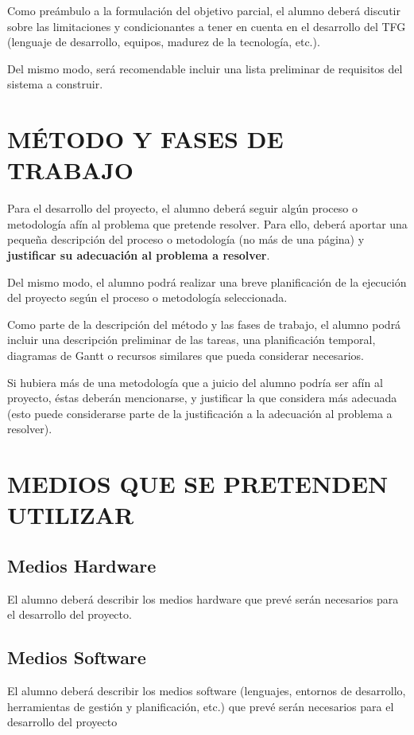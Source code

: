 \documentclass{pre-tfg}
\begin{document}
Como preámbulo a la formulación del objetivo parcial, el alumno deberá discutir sobre las
limitaciones y condicionantes a tener en cuenta en el desarrollo del TFG (lenguaje de
desarrollo, equipos, madurez de la tecnología, etc.).

Del mismo modo, será recomendable incluir una lista preliminar de requisitos del sistema a
construir.


\section{MÉTODO Y FASES DE TRABAJO}

Para el desarrollo del proyecto, el alumno deberá seguir algún proceso o metodología afín
al problema que pretende resolver. Para ello, deberá aportar una pequeña descripción del
proceso o metodología (no más de una página) y \textbf{justificar su adecuación al
  problema a resolver}.

Del mismo modo, el alumno podrá realizar una breve planificación de la ejecución del
proyecto según el proceso o metodología seleccionada.

Como parte de la descripción del método y las fases de trabajo, el alumno podrá incluir
una descripción preliminar de las tareas, una planificación temporal, diagramas de Gantt o
recursos similares que pueda considerar necesarios.

Si hubiera más de una metodología que a juicio del alumno podría ser afín al proyecto,
éstas deberán mencionarse, y justificar la que considera más adecuada (esto puede
considerarse parte de la justificación a la adecuación al problema a resolver).


\section{MEDIOS QUE SE PRETENDEN UTILIZAR}

\subsection{Medios Hardware}

El alumno deberá describir los medios hardware que prevé serán necesarios para el
desarrollo del proyecto.


\subsection{Medios Software}

El alumno deberá describir los medios software (lenguajes, entornos de desarrollo,
herramientas de gestión y planificación, etc.) que prevé serán necesarios para el
desarrollo del proyecto
\end{document}
